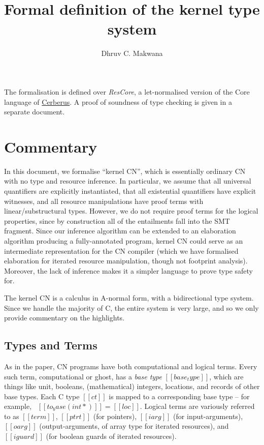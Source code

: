 \documentclass[11pt]{article}%
\title{\vspace{-2cm} Formal definition of the kernel type system}
\author{Dhruv C. Makwana}
\date{}
\begin{document}
\maketitle%


\noindent
The formalisation is defined
over \emph{ResCore}, a let-normalised version of the Core language of
\href{https://github.com/rems-project/cerberus}{Cerberus}. A proof of soundness
of type checking is given in a separate document.

{\let\clearpage\relax \tableofcontents}

\section{Commentary}
\label{sec:commentary}

In this document, we formalise ``kernel CN'',
which is essentially ordinary CN with no type and
resource inference. In particular, we assume that all
universal quantifiers are explicitly instantiated, that all
existential quantifiers have explicit witnesses, and all resource
manipulations have proof terms with linear/substructural
types. However, we do not require proof terms for the logical
properties, since by construction all of the entailments fall
into the SMT fragment. Since our inference algorithm can be extended
to an elaboration algorithm producing a fully-annotated program,
kernel CN could serve as an intermediate representation for the CN
compiler (which we have formalised elaboration for iterated resource
manipulation, though not footprint analysis).
Moreover, the lack of inference makes it a simpler language
to prove type safety for.

The kernel CN is a calculus in A-normal form, with a bidirectional
type system. Since we handle the majority of C, the entire system is very
large, and so we only provide commentary on the highlights.

\subsection{Types and Terms}

As in the paper, CN programs have both computational and logical terms.
Every such term, computational or ghost, has a \emph{base type} $[[ base_type ]]$,
which are things like unit, booleans, (mathematical) integers, locations,
and records of other base types. Each C type $[[ ct ]]$ is mapped to a
corresponding base type -- for example, \ $[[ to_base ( int * ) ]] = [[ loc ]]$.
Logical terms are variously referred to as $[[ term ]]$, $[[ ptrt ]]$
(for pointers), $[[ iarg ]]$ (for
input-arguments), $[[ oarg ]]$ (output-arguments, of array type for
iterated resources), and $[[ iguard ]]$ (for boolean guards of iterated resources).
\end{document}
